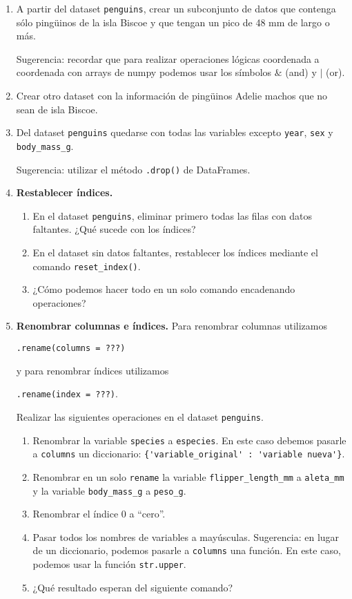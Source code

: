 \documentclass[a4paper,11pt]{article}
\theoremstyle{definition}
\begin{document}
\begin{enumerate}

\item A partir del dataset \lstinline{penguins}, crear un subconjunto de datos que contenga sólo ping\"uinos de la isla Biscoe y que tengan un pico de 48 mm de largo o más.

Sugerencia: recordar que para realizar operaciones lógicas coordenada a coordenada con arrays de numpy podemos usar los símbolos $\&$ (and) y $\mid$ (or).

\item Crear otro dataset con la información de ping\"uinos Adelie machos que no sean de isla Biscoe.

\item Del dataset \lstinline{penguins} quedarse con todas las variables excepto \lstinline{year}, \lstinline{sex} y \lstinline{body_mass_g}.

Sugerencia: utilizar el método \lstinline{.drop()} de DataFrames.

\item \textbf{Restablecer índices.}
\begin{enumerate}
\item En el dataset \lstinline{penguins}, eliminar primero todas las filas con datos faltantes. ¿Qué sucede con los índices?
\item En el dataset sin datos faltantes, restablecer los índices mediante el comando \lstinline{reset_index()}.
\item ¿Cómo podemos hacer todo en un solo comando encadenando operaciones?
\end{enumerate}

\item \textbf{Renombrar columnas e \'indices.} Para renombrar columnas utilizamos

\lstinline{.rename(columns = ???)}

y para renombrar índices utilizamos

\lstinline{.rename(index = ???)}.

Realizar las siguientes operaciones en el dataset \lstinline{penguins}.
\begin{enumerate}
\item Renombrar la variable \lstinline{species} a \lstinline {especies}. En este caso debemos pasarle a \lstinline{columns} un diccionario: \lstinline|{'variable_original' : 'variable nueva'}|.
\item Renombrar en un solo \lstinline{rename} la variable \lstinline{flipper_length_mm} a \lstinline{aleta_mm} y la variable \lstinline{body_mass_g} a \lstinline{peso_g}.
\item Renombrar el \'indice 0 a ``cero''.
\item Pasar todos los nombres de variables a mayúsculas. Sugerencia: en lugar de un diccionario, podemos pasarle a \lstinline{columns} una función. En este caso, podemos usar la función \lstinline{str.upper}.
\item ¿Qué resultado esperan del siguiente comando?


\end{enumerate}
\end{enumerate}
\end{document}
